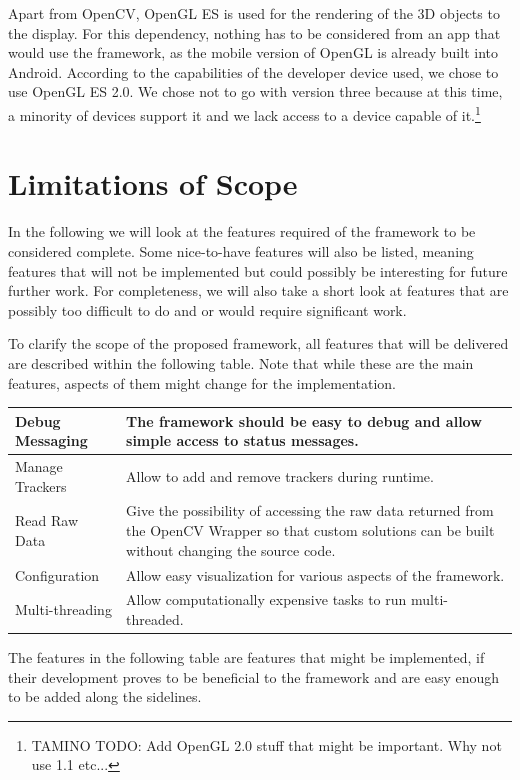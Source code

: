 Apart from OpenCV, OpenGL ES is used for the rendering of the 3D objects to the display.
For this dependency, nothing has to be considered from an app that would use the framework, as the mobile version of OpenGL is already built into Android.
According to the capabilities of the developer device used, we chose to use OpenGL ES 2.0.
We chose not to go with version three because at this time, a minority of devices support it and we lack access to a device capable of it.\footnote{TAMINO TODO: Add OpenGL 2.0 stuff that might be important. Why not use 1.1 etc...}

\section{Limitations of Scope}
\label{scope_limit}

In the following we will look at the features required of the framework to be considered complete.
Some nice-to-have features will also be listed, meaning features that will not be implemented but could possibly be interesting for future further work.
For completeness, we will also take a short look at features that are possibly too difficult to do and or would require significant work.

To clarify the scope of the proposed framework, all features that will be delivered are described within the following table.
Note that while these are the main features, aspects of them might change for the implementation.

\begin{tabulary}{\textwidth}{L || L}
Debug Messaging & The framework should be easy to debug and allow simple access to status messages.\\
\hline
Manage Trackers & Allow to add and remove trackers during runtime.\\
\hline
Read Raw Data & Give the possibility of accessing the raw data returned from the OpenCV Wrapper so that custom solutions can be built without changing the source code.\\
\hline
Configuration & Allow easy visualization for various aspects of the framework.\\
\hline
Multi-threading & Allow computationally expensive tasks to run multi-threaded.\\
\end{tabulary}

The features in the following table are features that might be implemented, if their development proves to be beneficial to the framework and are easy enough to be added along the sidelines.

